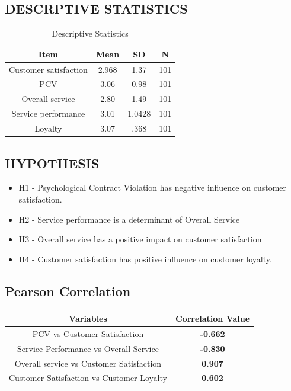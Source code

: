 \documentclass[a4paper, 14pt]{article}
\begin{document}
{\subsection*{DESCRPTIVE STATISTICS}
\begin{table}[H]
\centering
\begin{tabular}{|c|c|c|c|}
\hline
Item & \textbf{Mean} & \textbf{SD} & N \\
\hline
Customer satisfaction & 2.968 & 1.37 & 101 \\
\hline
PCV & 3.06 & 0.98 & 101 \\
\hline
Overall service & 2.80 & 1.49 & 101 \\
\hline
Service performance & 3.01 & 1.0428 & 101 \\
\hline
Loyalty & 3.07 & .368 & 101 \\
\hline
\end{tabular}
\caption{Descriptive Statistics}
\end{table}

\subsection*{HYPOTHESIS}
\begin{itemize}
\item H1 - Psychological Contract Violation has negative influence on customer satisfaction.
\item H2 - Service performance is a determinant of Overall Service
\item H3 - Overall service has a positive impact on customer satisfaction
\item H4 - Customer satisfaction has positive influence on customer loyalty.
\end{itemize}

\subsection*{Pearson Correlation}
\begin{center}
\begin{tabular}{|c|c|}
\hline
Variables & Correlation Value \\
\hline
PCV vs Customer Satisfaction & \textbf{-0.662} \\
Service Performance vs Overall Service & \textbf{-0.830} \\
Overall service vs Customer Satisfaction & \textbf{0.907} \\
Customer Satisfaction vs Customer Loyalty & \textbf{0.602} \\
\hline
\end{tabular}
\end{center}

}
\end{document}
